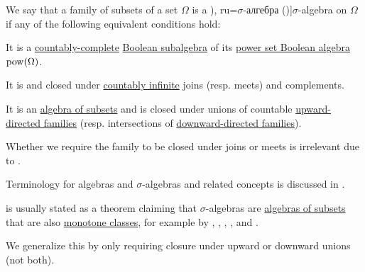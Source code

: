 \begin{definition}\label{def:sigma_algebra}
  We say that a family of subsets of a set \( \Omega \) is a \term[bg=\( \sigma \)-алгебра (\cite[def. 3.3]{Драганов2022ТеорияНаМярката}), ru=\( \sigma \)-алгебра (\cite[def. II.1.4]{Ширяев2007ВероятностиТом1})]{\( \sigma \)-algebra} on \( \Omega \) if any of the following equivalent conditions hold:
  \begin{thmenum}
    \mimprovised It is a \hyperref[def:countably_complete_lattice]{countably-complete} \hyperref[def:boolean_algebra/submodel]{Boolean subalgebra} of its \hyperref[thm:boolean_algebra_of_subsets]{power set Boolean algebra} \( \operatorname{pow}(\Omega) \).

     It is  and closed under \hyperref[def:set_countability/countably_infinite]{countably infinite} joins (resp. meets) and complements.

     It is an \hyperref[def:algebra_of_subsets]{algebra of subsets} and is closed under unions of countable \hyperref[def:directed_set]{upward-directed families} (resp. intersections of \hyperref[def:directed_set]{downward-directed families}).
  \end{thmenum}
\end{definition}
\begin{comments}
  \item Whether we require the family to be closed under joins or meets is irrelevant due to .

  \item Terminology for algebras and \( \sigma \)-algebras and related concepts is discussed in .
  \item {} is usually stated as a theorem claiming that \( \sigma \)-algebras are \hyperref[def:algebra_of_subsets]{algebras of subsets} that are also \hyperref[def:monotone_class]{monotone classes}, for example by
  ,
  ,
  ,
  ,
   and
  .

  We generalize this by only requiring closure under upward or downward unions (not both).
\end{comments}
